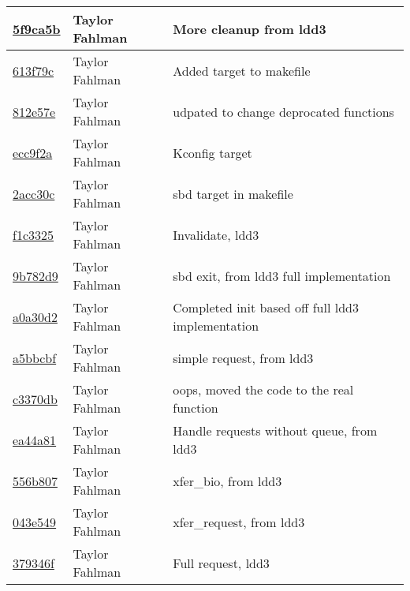 \begin{tabular}{l l l}
\href{https://github.com/fahlmant/cs444/commit/5f9ca5b506e502aaa1e4103dbdc7c91220471bd6}{5f9ca5b} & Taylor Fahlman & More cleanup from ldd3\\\hline
\href{https://github.com/fahlmant/cs444/commit/613f79c8756dc8338c7749a141e23f270ec615fd}{613f79c} & Taylor Fahlman & Added target to makefile\\\hline
\href{https://github.com/fahlmant/cs444/commit/812e57e06b0a842babf05c78b43413c10697b97e}{812e57e} & Taylor Fahlman & udpated to change deprocated functions\\\hline
\href{https://github.com/fahlmant/cs444/commit/ecc9f2a339b8b574a762b1329a18bb9cd677318e}{ecc9f2a} & Taylor Fahlman & Kconfig target\\\hline
\href{https://github.com/fahlmant/cs444/commit/2acc30cce09a4737ddc47dae0858626e3452e5d3}{2acc30c} & Taylor Fahlman & sbd target in makefile\\\hline
\href{https://github.com/fahlmant/cs444/commit/f1c33256670dd241e6017234879534c7039a3032}{f1c3325} & Taylor Fahlman & Invalidate, ldd3\\\hline
\href{https://github.com/fahlmant/cs444/commit/9b782d93b8f054a5c1cf1e61b5cf40183f3857e7}{9b782d9} & Taylor Fahlman & sbd exit, from ldd3 full implementation\\\hline
\href{https://github.com/fahlmant/cs444/commit/a0a30d2c9c9fd9f76993f86a59a6195c571db27b}{a0a30d2} & Taylor Fahlman & Completed init based off full ldd3 implementation\\\hline
\href{https://github.com/fahlmant/cs444/commit/a5bbcbfe1f20b45f2902911217caeead7b5230e9}{a5bbcbf} & Taylor Fahlman & simple request, from ldd3\\\hline
\href{https://github.com/fahlmant/cs444/commit/c3370db316fc781f54c9b53345cd596653ce68d3}{c3370db} & Taylor Fahlman & oops, moved the code to the real function\\\hline
\href{https://github.com/fahlmant/cs444/commit/ea44a818a5d009be8ea588c0457ee154adadd8fe}{ea44a81} & Taylor Fahlman & Handle requests without queue, from ldd3\\\hline
\href{https://github.com/fahlmant/cs444/commit/556b807f9df3c2511c99834f90a7db474be95ed6}{556b807} & Taylor Fahlman & xfer_bio, from ldd3\\\hline
\href{https://github.com/fahlmant/cs444/commit/043e5496aa11e70af81a109354acf313e04546f3}{043e549} & Taylor Fahlman & xfer_request, from ldd3\\\hline
\href{https://github.com/fahlmant/cs444/commit/379346f09f81f25716488cb6f078b36eb55ad95b}{379346f} & Taylor Fahlman & Full request, ldd3\\\hline

\end{tabular}
